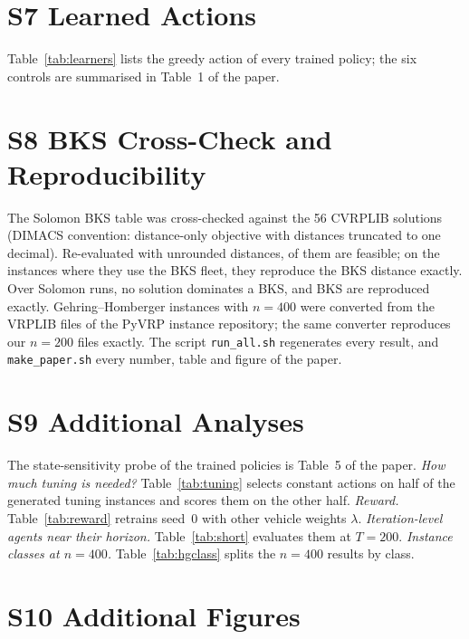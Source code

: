 \documentclass[runningheads]{llncs}
\begin{document}
\section*{S7 Learned Actions}
Table~\ref{tab:learners} lists the greedy action of every trained policy; the six controls are summarised
in Table~1 of the paper.


\section*{S8 BKS Cross-Check and Reproducibility}
The Solomon BKS table was cross-checked against the 56 CVRPLIB solutions (DIMACS convention: distance-only objective
with distances truncated to one decimal). Re-evaluated with unrounded distances, \tCvFeas{} of them are feasible; on
the \tCvSame{} instances where they use the BKS fleet, they reproduce the BKS distance exactly. Over \tNsolRuns{}
Solomon runs, no solution dominates a BKS, and \tBksHit{} BKS are reproduced exactly. Gehring--Homberger instances
with $n=400$ were converted from the VRPLIB files of the PyVRP instance repository; the same converter reproduces our
$n=200$ files exactly. The script \texttt{run\_all.sh} regenerates every result, and \texttt{make\_paper.sh} every
number, table and figure of the paper.

\section*{S9 Additional Analyses}
The state-sensitivity probe of the trained policies is Table~5 of the paper.
\emph{How much tuning is needed?} Table~\ref{tab:tuning} selects constant actions on half of the generated tuning
instances and scores them on the other half. \emph{Reward.} Table~\ref{tab:reward} retrains seed~0 with other vehicle
weights $\lambda$. \emph{Iteration-level agents near their horizon.} Table~\ref{tab:short} evaluates them at $T=200$.
\emph{Instance classes at $n=400$.} Table~\ref{tab:hgclass} splits the $n=400$ results by class.





\section*{S10 Additional Figures}
\end{document}
